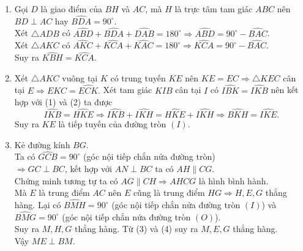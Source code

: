 \begin{bt}
{\begin{enumerate}
			\item Gọi $D$ là giao điểm của $BH$ và $AC$, mà $H$ là trực tâm tam giác $ABC$ nên $BD\perp AC$ hay $\widehat{BDA}=90^\circ$.\\
			Xét $\triangle ADB$ có $\widehat{ABD}+\widehat{BDA}+\widehat{DAB}=180^\circ \Rightarrow \widehat{ABD}=90^\circ - \widehat{BAC}$.\\
			Xét $\triangle AKC$ có $\widehat{AKC}+\widehat{KCA}+\widehat{KAC}=180^\circ \Rightarrow \widehat{KCA}=90^\circ - \widehat{BAC}$.\\
			Suy ra $\widehat{KBH}=\widehat{KCA}.$ 
			\item Xét $\triangle AKC$ vuông tại $K$ có trung tuyến $KE$ nên $KE=EC \Rightarrow \triangle KEC$ cân tại $E \Rightarrow \widehat{EKC}=\widehat{ECK}.$ 
			Xét tam giác $KIB$ cân tại $I$ có $\widehat{IBK}=\widehat{IKB}$ nên kết hợp với (1) và  (2) ta được
			\[\widehat{IKB}=\widehat{HKE}\Rightarrow \widehat{IKB}+\widehat{IKH}=\widehat{HKE}+\widehat{IKH}\Rightarrow \widehat{BKH}=\widehat{IKE}.\]
			Suy ra $KE$ là tiếp tuyến của đường tròn $(I)$.
			\item Kẻ đường kính $BG$.\\
			Ta có $\widehat{GCB}=90^\circ$ (góc nội tiếp chắn nửa đường tròn)\\
			$\Rightarrow GC \perp BC$, kết hợp với $AN\perp BC$ ta có $AH \parallel CG$. \\
			Chứng minh tương tự ta có $AG\parallel CH\Rightarrow AHCG$ là hình bình hành. \\
			Mà $E$ là trung điểm $AC$ nên $E$ cũng là trung điểm $HG \Rightarrow H,E,G$ thẳng hàng. 
			Lại có $\widehat{BMH}=90^\circ$ (góc nội tiếp chắn nửa đường tròn $(I)$) và $\widehat{BMG}=90^\circ$ (góc nội tiếp chắn nửa đường tròn $(O)$).\\
			Suy ra $M,H,G$ thẳng hàng. 
			Từ (3) và (4) suy ra $M,E,G$ thẳng hàng.\\
			Vậy $ME\perp BM$.
		\end{enumerate}
	}
\end{bt}

